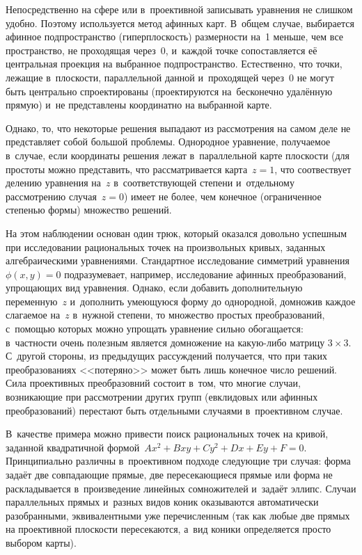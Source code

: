 \documentclass{article}
\begin{document}
Непосредственно на сфере или в~проективной записывать уравнения не слишком
удобно. Поэтому используется метод афинных карт. В~общем случае, выбирается
афинное подпространство (гиперплоскость) размерности на~1 меньше, чем все
пространство, не проходящая через~0, и~каждой точке сопоставляется её
центральная проекция на выбранное подпространство. Естественно, что точки,
лежащие в~плоскости, параллельной данной и~проходящей через~0 не могут быть
центрально спроектированы (проектируются на~бесконечно удалённую прямую) и~не
представлены координатно на выбранной карте.

Однако, то, что некоторые решения выпадают из рассмотрения на самом деле не
представляет собой большой проблемы. Однородное уравнение, получаемое в~случае,
если координаты решения лежат в~параллельной карте плоскости (для простоты можно
представить, что рассматривается карта~$z = 1$, что соотвествует делению
уравнения на~$z$ в~соответствующей степени и~отдельному рассмотрению случая~$z =
0$) имеет не более, чем конечное (ограниченное степенью формы) множество
решений.

На этом наблюдении основан один трюк, который оказался довольно успешным при
исследовании рациональных точек на произвольных кривых, заданных алгебраическими
уравнениями. Стандартное исследование симметрий уравнения~$\phi(x, y) = 0$
подразумевает, например, исследование афинных преобразований, упрощающих вид
уравнения. Однако, если добавить дополнительную переменную~$z$ и~дополнить
умеющуюся форму до однородной, домножив каждое слагаемое на~$z$ в~нужной
степени, то множество простых преобразований, с~помощью которых можно упрощать
уравнение сильно обогащается: в~частности очень полезным является домножение на
какую-либо матрицу $3 \times 3$. С~другой стороны, из предыдущих рассуждений
получается, что при таких преобразованиях <<потеряно>> может быть лишь конечное
число решений. Сила проективных преобразовний состоит в~том, что многие случаи,
возникающие при рассмотрении других групп (евклидовых или афинных
преобразований) перестают быть отдельными случаями в~проективном случае.

В~качестве примера можно привести поиск рациональных точек на кривой, заданной
квадратичной формой~$Ax^2 + Bxy + Cy^2 + Dx + Ey + F = 0$. Принципиально
различны в~проективном подходе следующие три случая: форма задаёт две
совпадающие прямые, две пересекающиеся прямые или форма не раскладывается
в~произведение линейных сомножителей и~задаёт эллипс. Случаи параллельных
прямых и~разных видов коник оказываются автоматически разобранными,
эквивалентными уже перечисленным (так как любые две прямых на проективной
плоскости пересекаются, а~вид коники определяется просто выбором карты).
\end{document}
